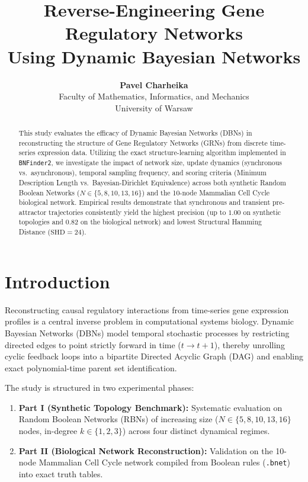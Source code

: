 \documentclass[11pt,a4paper]{article}
\title{\textbf{Reverse-Engineering Gene Regulatory Networks\\Using Dynamic Bayesian Networks}}
\author{\textbf{Pavel Charheika}\\Faculty of Mathematics, Informatics, and Mechanics\\University of Warsaw}
\date{}
\begin{document}
\maketitle

\begin{abstract}
This study evaluates the efficacy of Dynamic Bayesian Networks (DBNs) in reconstructing the structure of Gene Regulatory Networks (GRNs) from discrete time-series expression data. Utilizing the exact structure-learning algorithm implemented in \texttt{BNFinder2}, we investigate the impact of network size, update dynamics (synchronous vs.\ asynchronous), temporal sampling frequency, and scoring criteria (Minimum Description Length vs.\ Bayesian-Dirichlet Equivalence) across both synthetic Random Boolean Networks ($N \in \{5, 8, 10, 13, 16\}$) and the 10-node Mammalian Cell Cycle biological network. Empirical results demonstrate that synchronous and transient pre-attractor trajectories consistently yield the highest precision (up to $1.00$ on synthetic topologies and $0.82$ on the biological network) and lowest Structural Hamming Distance ($\text{SHD} = 24$).
\end{abstract}

\section{Introduction}
Reconstructing causal regulatory interactions from time-series gene expression profiles is a central inverse problem in computational systems biology. Dynamic Bayesian Networks (DBNs) model temporal stochastic processes by restricting directed edges to point strictly forward in time ($t \to t+1$), thereby unrolling cyclic feedback loops into a bipartite Directed Acyclic Graph (DAG) and enabling exact polynomial-time parent set identification.

The study is structured in two experimental phases:
\begin{enumerate}
    \item \textbf{Part I (Synthetic Topology Benchmark):} Systematic evaluation on Random Boolean Networks (RBNs) of increasing size ($N \in \{5, 8, 10, 13, 16\}$ nodes, in-degree $k \in \{1, 2, 3\}$) across four distinct dynamical regimes.
    \item \textbf{Part II (Biological Network Reconstruction):} Validation on the 10-node Mammalian Cell Cycle network compiled from Boolean rules (\texttt{.bnet}) into exact truth tables.
\end{enumerate}
\end{document}
